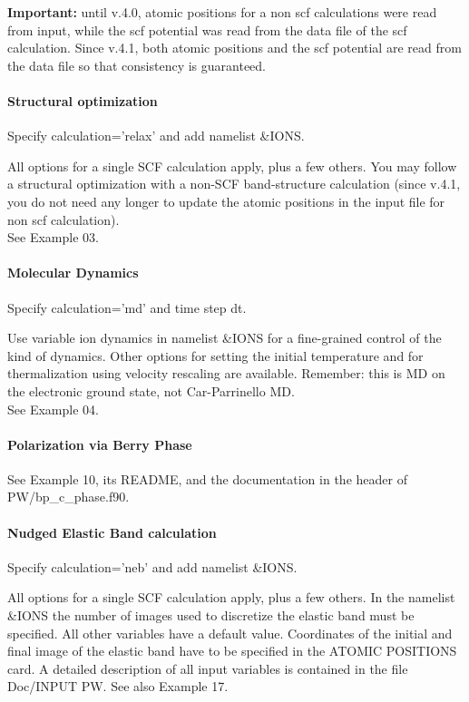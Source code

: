 \documentclass[12pt,a4paper]{article}
\begin{document}
{\bf Important:} until v.4.0, atomic positions for a non scf calculations 
were read from input, while the scf potential was read from the data file
of the scf calculation. Since v.4.1, both atomic positions and the scf
potential are read from the data file so that consistency is guaranteed.

\paragraph{Structural optimization}
Specify calculation='relax' and add namelist \&IONS.

All options for a single SCF calculation apply, plus a few others. You
may follow a structural optimization with a non-SCF band-structure
calculation (since v.4.1, you do not need any longer to update the 
atomic positions in the input file for non scf calculation).\\
See Example 03.

\paragraph{Molecular Dynamics} 
Specify calculation='md' and time step dt.

Use variable ion dynamics in namelist \&IONS for a fine-grained control
of the kind of dynamics. Other options for setting the initial
temperature and for thermalization using velocity rescaling are
available. Remember: this is MD on the electronic ground state, not
Car-Parrinello MD.\\
See Example 04.

\paragraph{Polarization via Berry Phase}
See Example 10, its README, and the documentation in the header of
PW/bp\_c\_phase.f90. 

\paragraph{Nudged Elastic Band calculation}
Specify calculation='neb' and add namelist \&IONS.

All options for a single SCF calculation apply, plus a few others. In the
namelist \&IONS the number of images used to discretize the elastic band
must be specified. All other variables have a default value. Coordinates
of the initial and final image of the elastic band have to be specified
in the ATOMIC POSITIONS card. A detailed description of all input
variables is contained in the file Doc/INPUT PW. See also Example 17.
\end{document}
